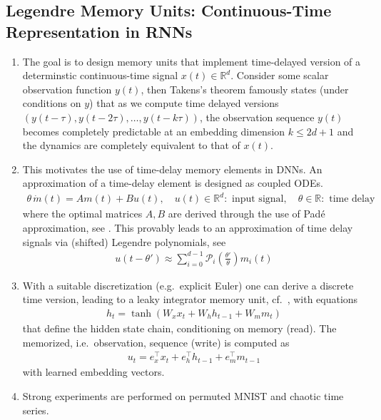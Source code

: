 \documentclass[12pt,a4paper]{article}
\newcommand{\mc}{\mathcal}
\renewcommand{\Re}{\mathbb R}
\begin{document}
\subsection{Legendre Memory Units: Continuous-Time Representation in RNNs \cite{voelker2019legendre}}
\begin{enumerate}
\item 
The goal is to design memory units that implement time-delayed version of a determinstic continuous-time signal $x(t) \in \Re^d$. Consider some scalar observation function $y(t)$, then Takens's theorem \cite{takens1981detecting} famously states (under conditions on $y$) that as we compute time delayed versions $(y(t - \tau), y(t-2\tau),\dots,y(t-k\tau))$, the observation sequence $y(t)$ becomes completely predictable at an embedding dimension  $k \le 2d+1$ and the dynamics are completely equivalent to that of $x(t)$. 
\item 
This motivates the use of time-delay memory elements in DNNs. An approximation of a time-delay element is designed as coupled ODEs. 
\begin{align}
\theta \, \dot m(t) = Am(t) + Bu(t), \quad u(t) \in \Re^d: \text{ input signal},\quad \theta \in \Re: \text{ time delay}
\end{align} 
where the optimal matrices $A,B$ are derived through the use of Pad\'e approximation, see \cite[Eq.~(2)]{voelker2019legendre}. This provably leads to an approximation of time delay signals via (shifted) Legendre polynomials, see \cite[Eq.~(3)]{voelker2019legendre}
\begin{align}
u(t-\theta') \approx \sum_{i=0}^{d-1} \mc P _i \left(\frac {\theta'} \theta \right) m_i(t)
\end{align}
\item With a suitable discretization (e.g.~explicit Euler) one can derive a discrete time version, leading to a leaky integrator memory unit, cf.~\cite[Figure 2)]{voelker2019legendre}, with equations
\begin{align}
h_t = \tanh(W_x x_t + W_h h_{t-1} + W_m m_t)
\end{align}
that define the hidden state chain, conditioning on memory (read).  The memorized, i.e.~observation, sequence (write) is computed as
\begin{align}
u_t = e_x^\top x_t + e_h^\top h_{t-1} + e_m^\top m_{t-1}
\end{align}
with learned embedding vectors. 
\item Strong experiments are performed on permuted MNIST and chaotic time series. 
\end{enumerate}
\end{document}
